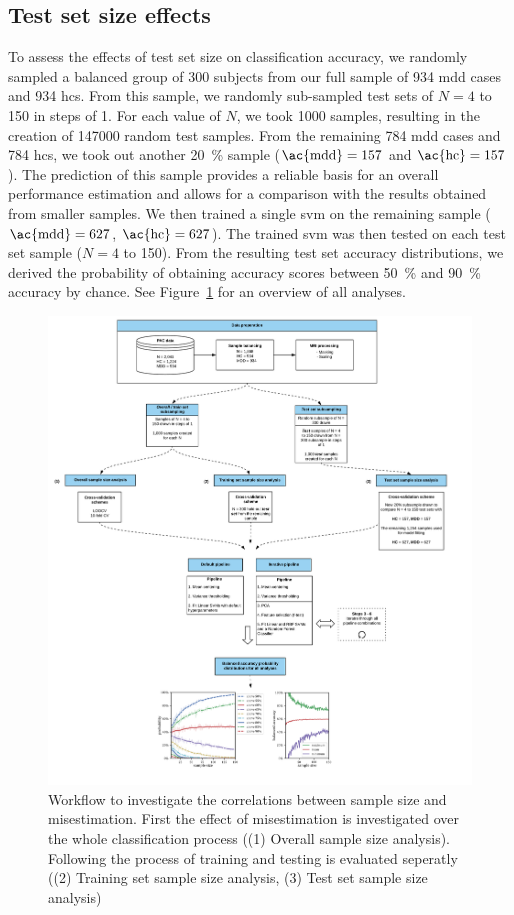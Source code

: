 \documentclass[12pt,a4paper]{article}
\begin{document}
    \subsection{Test set size effects}
    To assess the effects of test set size on classification accuracy, we randomly sampled a balanced group of \num{300} subjects from our full sample of \num{934} \ac{mdd} cases and \num{934} \acp{hc}. From this sample, we randomly sub-sampled test sets of $N=\num{4}$ to \num{150} in steps of \num{1}. For each value of $N$, we took \num{1000} samples, resulting in the creation of \num{147000} random test samples. From the remaining \num{784} \ac{mdd} cases and \num{784} \acp{hc}, we took out another \SI{20}{\percent} sample ($\text{\ac{mdd}}=157$ and $\text{\ac{hc}}=157$). The prediction of this sample provides a reliable basis for an overall performance estimation and allows for a comparison with the results obtained from smaller samples. We then trained a single \ac{svm} on the remaining sample ($\text{\ac{mdd}}=627$, $\text{\ac{hc}}=627$). The trained \ac{svm} was then tested on each test set sample ($N=\num{4}$ to \num{150}). From the resulting test set accuracy distributions, we derived the probability of obtaining accuracy scores between \SI{50}{\percent} and \SI{90}{\percent} accuracy by chance. See Figure~\ref{fig:workflow} for an overview of all analyses.

    \begin{figure}
        \includegraphics[width=\textwidth]{./images/figure_1}
        \caption{Workflow to investigate the correlations between sample size and misestimation. First the effect of misestimation is investigated over the whole classification process ((1) Overall sample size analysis). Following the process of training and testing is evaluated seperatly ((2) Training set sample size analysis, (3) Test set sample size analysis)}
        \label{fig:workflow}
    \end{figure}
\end{document}
